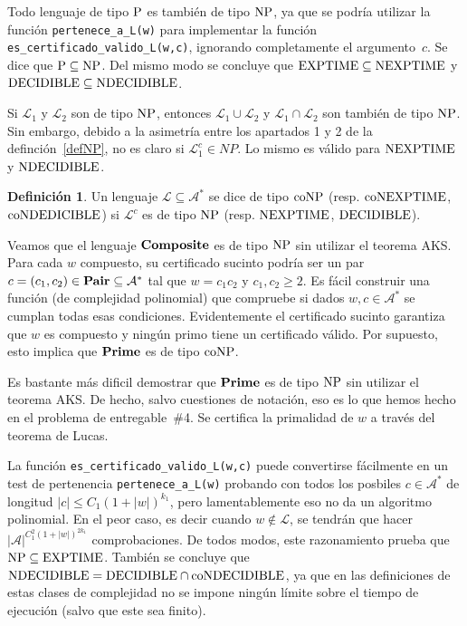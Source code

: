 \documentclass[a4paper, 11pt]{article}
\newcommand{\Alf}{\mathcal{A}}
\newcommand{\Lan}{\mathcal{L}}
\theoremstyle{plain}
\theoremstyle{definition}
\newtheorem{defi}[teor]{Definición}
\begin{document}
\bigskip

Todo lenguaje de tipo ${\rm P}$ es también de tipo ${\rm NP}$, ya que se podría utilizar
la función \texttt{pertenece\_a\_L(w)} para implementar la función
\texttt{es\_certificado\_valido\_L(w,c)}, ignorando completamente el argumento~$c$.
Se dice que ${\rm P}\subseteq {\rm NP}$. Del mismo modo se concluye que
${\rm EXPTIME}\subseteq {\rm NEXPTIME}$ y ${\rm DECIDIBLE}\subseteq{\rm NDECIDIBLE}$.

\bigskip

Si $\Lan_1$ y $\Lan_2$ son de tipo ${\rm NP}$, entonces $\Lan_1\cup\Lan_2$ y
$\Lan_1\cap\Lan_2$ son también de tipo ${\rm NP}$. Sin embargo, debido a la asimetría
entre los apartados 1 y 2 de la definción~\ref{defNP}, no es claro si $\Lan_1^c\in NP$.
Lo mismo es válido para ${\rm NEXPTIME}$ y ${\rm NDECIDIBLE}$.

\bigskip

\begin{defi}
Un lenguaje $\Lan\subseteq\Alf^*$ se dice de tipo ${\rm coNP}$ (resp. ${\rm coNEXPTIME}$,
${\rm coNDEDICIBLE}$) si $\Lan^c$ es de tipo ${\rm NP}$ (resp. ${\rm NEXPTIME}$,
${\rm DECIDIBLE}$).
\end{defi}

\bigskip

Veamos que el lenguaje ${\bf Composite}$ es de tipo ${\rm NP}$ sin utilizar el
teorema AKS. Para cada $w$ compuesto, su certificado sucinto podría ser un par
$c=(c_1,c_2)\in {\bf Pair}\subseteq\Alf^*$ tal que $w=c_1c_2$ y $c_1,c_2\geq 2$.
Es fácil construir una función (de complejidad polinomial) que compruebe si dados
$w,c\in\Alf^*$ se cumplan todas esas condiciones. Evidentemente el certificado
sucinto garantiza que $w$ es compuesto y ningún primo tiene un certificado válido.
Por supuesto, esto implica que ${\bf Prime}$ es de tipo ${\rm coNP}$.

\bigskip

Es bastante más dificil demostrar que ${\bf Prime}$ es de tipo ${\rm NP}$ sin utilizar
el teorema AKS. De hecho, salvo cuestiones de notación, eso es lo que hemos hecho en
el problema de entregable~\#4. Se certifica la primalidad de $w$ a través del
teorema de Lucas.

\bigskip

La función \texttt{es\_certificado\_valido\_L(w,c)} puede convertirse fácilmente en
un test de pertenencia \texttt{pertenece\_a\_L(w)} probando con todos los posbiles
$c\in\Alf^*$ de longitud $|c|\leq C_1(1+|w|)^{k_1}$, pero lamentablemente eso no
da un algoritmo polinomial. En el peor caso, es decir cuando $w\not\in\Lan$, se
tendrán que hacer $|\Alf|^{C_1^2(1+|w|)^{2k_1}}$ comprobaciones. De todos modos,
este razonamiento prueba que ${\rm NP}\subseteq {\rm EXPTIME}$. También se concluye
que ${\rm NDECIDIBLE}={\rm DECIDIBLE}\cap {\rm coNDECIDIBLE}$, ya que en las definiciones
de estas clases de complejidad no se impone ningún límite sobre el tiempo de ejecución
(salvo que este sea finito).
\end{document}
